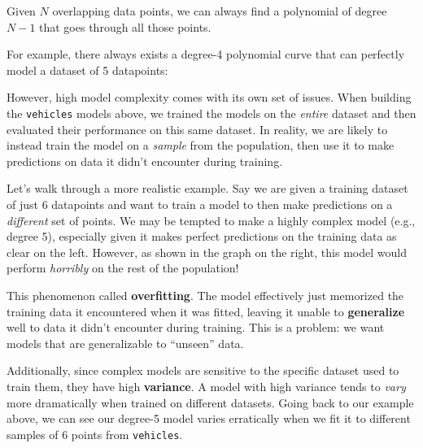 \documentclass[
  letterpaper,
  DIV=11,
  numbers=noendperiod]{scrreprt}
\begin{document}
\begin{tcolorbox}[enhanced jigsaw, titlerule=0mm, bottomtitle=1mm, arc=.35mm, colframe=quarto-callout-tip-color-frame, rightrule=.15mm, opacityback=0, opacitybacktitle=0.6, leftrule=.75mm, breakable, toprule=.15mm, colback=white, left=2mm, colbacktitle=quarto-callout-tip-color!10!white, toptitle=1mm, bottomrule=.15mm, title=\textcolor{quarto-callout-tip-color}{\faLightbulb}\hspace{0.5em}{Math Fact: Polynomial Degrees}, coltitle=black]

Given \(N\) overlapping data points, we can always find a polynomial of
degree \(N-1\) that goes through all those points.

For example, there always exists a degree-4 polynomial curve that can
perfectly model a dataset of 5 datapoints:

\end{tcolorbox}

However, high model complexity comes with its own set of issues. When
building the \texttt{vehicles} models above, we trained the models on
the \emph{entire} dataset and then evaluated their performance on this
same dataset. In reality, we are likely to instead train the model on a
\emph{sample} from the population, then use it to make predictions on
data it didn't encounter during training.

Let's walk through a more realistic example. Say we are given a training
dataset of just 6 datapoints and want to train a model to then make
predictions on a \emph{different} set of points. We may be tempted to
make a highly complex model (e.g., degree 5), especially given it makes
perfect predictions on the training data as clear on the left. However,
as shown in the graph on the right, this model would perform
\emph{horribly} on the rest of the population!

This phenomenon called \textbf{overfitting}. The model effectively just
memorized the training data it encountered when it was fitted, leaving
it unable to \textbf{generalize} well to data it didn't encounter during
training. This is a problem: we want models that are generalizable to
``unseen'' data.

Additionally, since complex models are sensitive to the specific dataset
used to train them, they have high \textbf{variance}. A model with high
variance tends to \emph{vary} more dramatically when trained on
different datasets. Going back to our example above, we can see our
degree-5 model varies erratically when we fit it to different samples of
6 points from \texttt{vehicles}.
\end{document}
